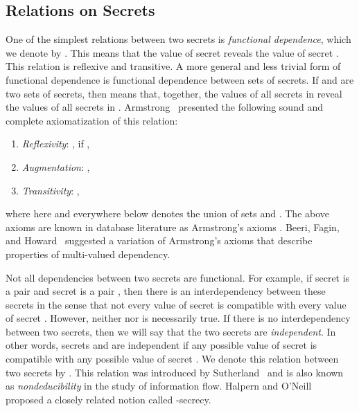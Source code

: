 \documentclass{llncs}
\begin{document}
\subsection{Relations on Secrets}
One of the simplest relations between two secrets is {\em functional dependence}, which we denote by . This means that the value of secret  reveals the value of secret . This relation is reflexive and transitive. 
A more general and less trivial form of functional dependence is functional dependence between sets of secrets. If  and  are two sets of secrets, then  means that, together, the values of all secrets in  reveal the values of all secrets in . Armstrong~\cite{a74} presented the following sound and complete axiomatization of this relation:
\begin{enumerate}
\item {\em Reflexivity}: , if ,
\item {\em Augmentation}: ,
\item {\em Transitivity}: ,
\end{enumerate}
where here and everywhere below  denotes the union of sets  and . The above axioms are known in database literature as Armstrong's axioms \cite[p.~81]{guw09}. Beeri, Fagin, and Howard~\cite{bfh77} suggested a variation of Armstrong's axioms that describe properties of multi-valued dependency.

Not all dependencies between two secrets are functional. For example, if secret  is a pair  and 
secret  is a pair , then there is an interdependency between these secrets in the sense that not every value of secret  is compatible with every value of secret . However, neither  nor  is necessarily true. If there is no interdependency between two secrets, then we will say that the two secrets are {\em independent}. In other words, secrets  and  are independent if any possible value of secret  is compatible with any possible value of secret . We denote this relation between two secrets by . This relation was introduced by Sutherland~\cite{s86} and is also known as {\em nondeducibility} in the study of information flow. Halpern and O'Neill~\cite{ho08} proposed a closely related notion called -secrecy. 
\end{document}
